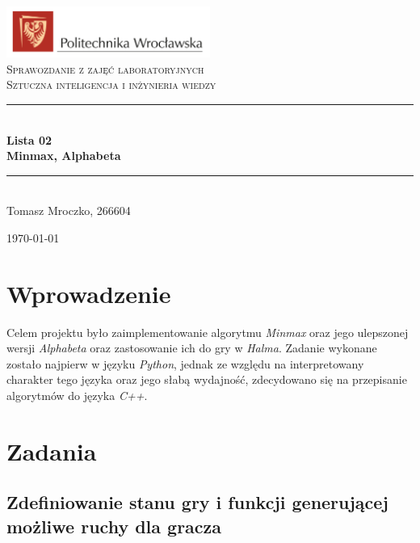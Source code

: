 \documentclass[a4paper, 12pt]{article}
\newcommand{\HRule}{\rule{\linewidth}{0.5mm}}
\begin{document}
\begin{titlepage}
  \begin{center}
    \includegraphics[width=0.5\textwidth]{images/logo.png}~\\[1cm]

    \textsc{Sprawozdanie z zajęć laboratoryjnych\\ Sztuczna inteligencja i inżynieria wiedzy\\[3cm]}


    \HRule \\[0.4cm]
    {\large \bfseries Lista 02 \\ Minmax, Alphabeta \\[0.4cm]}
    \HRule \\[8cm]


    Tomasz Mroczko, 266604 \\[3cm]

    \vfill

    {\today}

  \end{center}
\end{titlepage}


\newpage
\tableofcontents
\newpage


\section{Wprowadzenie}
Celem projektu było zaimplementowanie algorytmu 
\textit{Minmax} oraz jego ulepszonej wersji \textit{Alphabeta} oraz zastosowanie 
ich do gry w \textit{Halma}. Zadanie wykonane zostało najpierw w języku \textit{Python},
jednak ze względu na interpretowany charakter tego języka oraz jego słabą wydajność, 
zdecydowano się na przepisanie algorytmów do języka \textit{C++}.



\section{Zadania}

\subsection{Zdefiniowanie stanu gry i funkcji generującej możliwe ruchy dla gracza}
\end{document}
